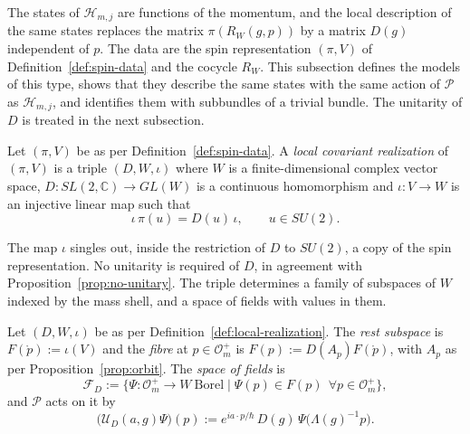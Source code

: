 The states of $\mathcal{H}_{m,j}$ are functions of the momentum, and the local description of the same states replaces the matrix $\pi(R_W(g,p))$ by a matrix $D(g)$ independent of $p$. The data are the spin representation $(\pi,V)$ of Definition~\ref{def:spin-data} and the cocycle $R_W$. This subsection defines the models of this type, shows that they describe the same states with the same action of $\mathcal{P}$ as $\mathcal{H}_{m,j}$, and identifies them with subbundles of a trivial bundle. The unitarity of $D$ is treated in the next subsection.

\begin{definition}\label{def:local-realization}
	Let $(\pi,V)$ be as per Definition~\ref{def:spin-data}. A \emph{local covariant realization} of $(\pi,V)$ is a triple $(D,W,\iota)$ where $W$ is a finite-dimensional complex vector space, $D:SL(2,\mathbb{C})\to GL(W)$ is a continuous homomorphism and $\iota:V\to W$ is an injective linear map such that
	\begin{equation}\label{eq:iota-intertwiner}
		\iota\,\pi(u)=D(u)\,\iota,\qquad u\in SU(2).
	\end{equation}
\end{definition}

The map $\iota$ singles out, inside the restriction of $D$ to $SU(2)$, a copy of the spin representation. No unitarity is required of $D$, in agreement with Proposition~\ref{prop:no-unitary}. The triple determines a family of subspaces of $W$ indexed by the mass shell, and a space of fields with values in them.

\begin{definition}\label{def:local-fields}
	Let $(D,W,\iota)$ be as per Definition~\ref{def:local-realization}. The \emph{rest subspace} is $F(\mathring{p}):=\iota(V)$ and the \emph{fibre} at $p\in\mathcal{O}_m^+$ is $F(p):=D(A_p)F(\mathring{p})$, with $A_p$ as per Proposition~\ref{prop:orbit}. The \emph{space of fields} is
	\begin{equation*}
		\mathcal{F}_D:=\{\Psi:\mathcal{O}_m^+\to W\ \text{Borel}\mid\Psi(p)\in F(p)\ \ \forall p\in\mathcal{O}_m^+\},
	\end{equation*}
	and $\mathcal{P}$ acts on it by
	\begin{equation}\label{eq:local-action}
		\big(\mathcal{U}_D(a,g)\Psi\big)(p):=e^{ia\cdot p/\hbar}\,D(g)\,\Psi\big(\Lambda(g)^{-1}p\big).
	\end{equation}
\end{definition}

